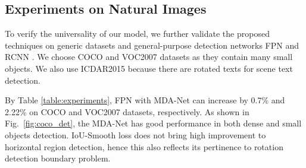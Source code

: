 \documentclass[10pt,twocolumn,letterpaper]{article}
\begin{document}
	\subsection{Experiments on Natural Images}\label{sec:ee}
	To verify the universality of our model, we further validate the proposed techniques on generic datasets and general-purpose detection networks FPN \cite{lin2017feature} and RCNN \cite{jiang2017r2cnn}. We choose COCO \cite{lin2014microsoft} and VOC2007 \cite{everingham2010pascal} datasets as they contain many small objects. We also use ICDAR2015 \cite{karatzas2015icdar} because there are rotated texts for scene text detection.
	
	By Table \ref{table:experiments}, FPN with MDA-Net can increase by 0.7\% and 2.22\% on COCO \cite{lin2014microsoft} and VOC2007 \cite{everingham2010pascal} datasets, respectively. As shown in Fig.~\ref{fig:coco_det}, the MDA-Net has good performance in both dense and small objects detection. IoU-Smooth loss does not bring high improvement to horizontal region detection, hence this also reflects its pertinence to rotation detection boundary problem.
	
\end{document}
